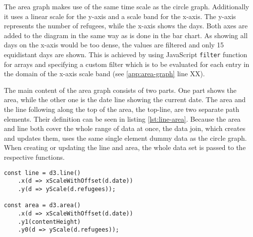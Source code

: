 The area graph makes use of the same time scale as the circle graph. Additionally it uses a linear scale for the y-axis and a scale band for the x-axis. The y-axis represents the number of refugees, while the x-axis shows the days. Both axes are added to the diagram in the same way as is done in the bar chart. As showing all days on the x-axis would be too dense, the values are filtered and only 15 equidistant days are shown. This is achieved by using JavaScript \texttt{filter} function for arrays and specifying a custom filter which is to be evaluated for each entry in the domain of the x-axis scale band (see \ref{app:area-graph} line XX).

The main content of the area graph consists of two parts. One part shows the area, while the other one is the date line showing the current date. The area and the line following along the top of the area, the top-line, are two separate path elements. Their definition can be seen in listing \ref{lst:line-area}. Because the area and line both cover the whole range of data at once, the data join, which creates and updates them, uses the same single element dummy data as the circle graph. When creating or updating the line and area, the whole data set is passed to the respective functions.

\begin{minipage}{0.9\linewidth}
    \begin{lstlisting}[style=htmlCSSjs, captionpos=b, caption={The first constant defines the function for creating the top-line of the area graph. This is achieved by specifying functions for x and y values. D3 uses them to calculate the position of each point on the line. Using the arrow functions here applies this for each entry of the data set which is passed as a parameter when calling this function. When the function is called and a data set is provided, by calling \texttt{line(data)}, the line is constructed by calculating the according x- and y-positions for every data point. Defining and creating the area works in similar fashion. Yet there are two y-positions for each x-position. \texttt{y0} is the bottom of the shape, while \texttt{y1} is the top. Switching the definition of \texttt{y0} and \texttt{y1} results in a reversed direction of the SVG path describing the outline of the shape. The \texttt{d3.area()} function allows for a huge variety of shapes. Yet it is not possible to create concave ends on the right or left side of the shape, assuming left and rigth are oriented horizontally. Of course the created shape can be rotated and oriented using all possible SVG tags and attributes. (Section from \ref{app:area-graph} lines 111ff)}, label={lst:line-area}]
const line = d3.line()
    .x(d => xScaleWithOffset(d.date))
    .y(d => yScale(d.refugees));

const area = d3.area()
    .x(d => xScaleWithOffset(d.date))
    .y1(contentHeight)
    .y0(d => yScale(d.refugees));
    \end{lstlisting}
\end{minipage}


